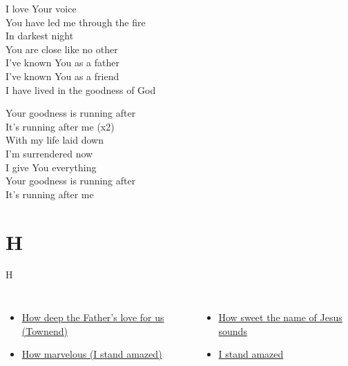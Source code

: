 \documentclass{beamer}
\begin{document}
{\begin{frame}{}
I love Your voice\\ 
You have led me through the fire\\ 
In darkest night\\ 
You are close like no other\\ 
I've known You as a father\\ 
I've known You as a friend\\ 
I have lived in the goodness of God 

\end{frame}

\hypertarget{Goodness of God['All my life You have been faithful']Br}{}
\begin{frame}{}
\fontsize{ 20 }{ 27 }\selectfont

Your goodness is running after\\ 
It’s running after me (x2)\\ 
With my life laid down\\ 
I’m surrendered now\\ 
I give You everything\\ 
Your goodness is running after\\ 
It's running after me 

\end{frame}

}
\section{H}

\begin{frame}{H}
\begin{columns}
    \begin{itemize}
    \item \hyperlink{How deep the Father's love for us[](Townend)1}{How deep the Father's love for us (Townend)}
    \item \hyperlink{I stand amazed['How marvelous']1}{How marvelous (I stand amazed)}
\end{itemize}
    \begin{itemize}
    \item \hyperlink{How sweet the name of Jesus sounds[]1}{How sweet the name of Jesus sounds }
    \item \hyperlink{I stand amazed['How marvelous']1}{I stand amazed }
\end{itemize}


\end{columns}

\end{frame}
\end{document}
